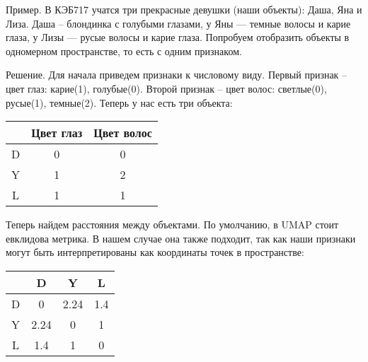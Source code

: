 Пример. В КЭБ717 учатся три прекрасные девушки (наши объекты): Даша, Яна и Лиза. Даша -- блондинка с голубыми глазами, у Яны --- темные волосы и карие глаза, у Лизы --- русые волосы и карие глаза. Попробуем отобразить объекты в одномерном пространстве, то есть с одним признаком.

Решение. Для начала приведем признаки к числовому виду. Первый признак -- цвет глаз: карие(1), голубые(0). Второй признак -- цвет волос: светлые(0), русые(1), темные(2). Теперь у нас есть три объекта:

\begin{center}
	\begin{tabular}{|c||c|c|}
		\hline
		 & Цвет глаз & Цвет волос\\
		\hline
		\hline
		D & 0 & 0\\
		\hline
		Y & 1 & 2\\
		\hline
		L & 1 & 1 \\
		\hline 
	\end{tabular}
\end{center}

Теперь найдем расстояния между объектами. По умолчанию, в UMAP стоит евклидова метрика. В нашем случае она также подходит, так как наши признаки могут быть интерпретированы как координаты точек в пространстве:

\begin{center}
	\begin{tabular}{|c||c|c|c|}
		\hline
		& D & Y & L\\
		\hline
		\hline
		D & 0 & 2.24 & 1.4\\
		\hline
		Y & 2.24 & 0 & 1\\
		\hline
		L & 1.4 & 1 & 0\\
		\hline 
	\end{tabular}
\end{center}